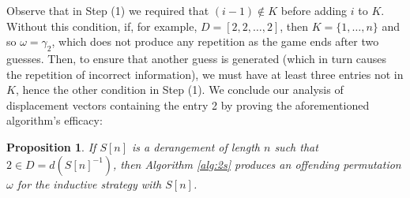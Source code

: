 \documentclass[article]{amsart}
\theoremstyle{plain}
\newtheorem{proposition}[theorem]{Proposition}
\begin{document}
Observe that in Step (1) we required that $(i-1) \notin K$ before adding $i$ to $K$. Without this condition, if, for example, $D = [2,2,\dots,2]$, then $K = \{1,\dots, n\}$ and so $\omega = \gamma_2$, which does not produce any repetition as the game ends after two guesses. Then, to ensure that another guess is generated (which in turn causes the repetition of incorrect information), we must have at least three entries not in $K$, hence the other condition in Step (1). We conclude our analysis of displacement vectors containing the entry 2 by proving the aforementioned algorithm's efficacy:

\begin{proposition} \label{prop:2s}
    If $S[n]$ is a derangement of length $n$ such that $2 \in D = d\left( S[n]^{-1} \right)$, then Algorithm \ref{alg:2s} produces an offending permutation $\omega$ for the inductive strategy with $S[n]$.
\end{proposition}
\end{document}
